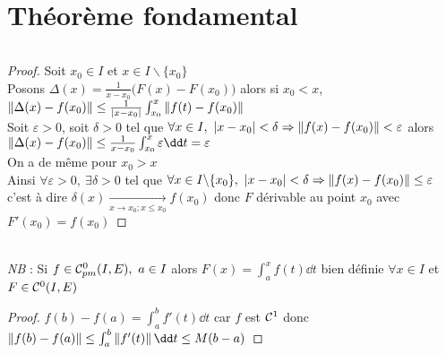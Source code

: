 \section{Théorème fondamental}
    ${}$ \\ 
    \begin{proof}
    Soit $x_0 \in I$ et $x\in I\backslash \{x_0\}$ \\Posons $\Delta (x) = \frac{1}{x-x_0}\big( F(x) - F(x_0)\big)$ alors si $x_0<x$, 
    $\left\Vert \Delta (x) - f(x_0) \right\Vert \leq  \frac{1}{\left\vert x-x_0 \right\vert} \int_{x_0}^x \left\Vert f(t) - f(x_0) \right\Vert$ \\ Soit $\varepsilon >0 $, soit $\delta >0$ tel 
    que $\forall x\in I ,~\left\vert x-x_0 \right\vert <\delta \Rightarrow \left\Vert f(x)-f(x_0) \right\Vert <\varepsilon$ alors \\$\norm{\Delta (x) - f(x_0)} \leq 
    \frac{1}{x-x_0} \int_{x_0}^x \varepsilon \dd t = \varepsilon$ \\ On a de même pour $x_0 > x$\\
    Ainsi $\forall \varepsilon > 0 ,~\exists \delta >0$ tel que $\forall x\in I \backslash \{x_0\} ,~\left\vert x-x_0 \right\vert <\delta \Rightarrow 
    \left\Vert f(x) - f(x_0) \right\Vert \leq \varepsilon$ \\c'est à dire $\delta (x) \underset{x\rightarrow x_0 ; x\leqslant x_0}{\longrightarrow} f(x_0)$ donc $F$ 
    dérivable au point $x_0$ avec $F'(x_0) = f(x_0)$
    \end{proof}
    ${}$ \\ 
    \\ {\small\emph{NB} : Si $f\in{\mathcal{C}_{pm}^0} (I,E) ,~a\in I$ alors $F(x) = \int_a^x f(t) \dd t$ bien définie $\forall x\in I$ et 
    $F\in{\mathcal{C}}^0(I,E)$}
    \vspace*{0.5cm} \\ 
    \begin{proof}
    $f(b)-f(a) = \int_a^b f'(t) \dd t $ car $f$ est ${\mathcal{C}}^1$ donc $\norm{f(b)-f(a)} \leq \int_a^b \norm{f'(t)}\dd t \leq M(b-a)$
    \end{proof}
